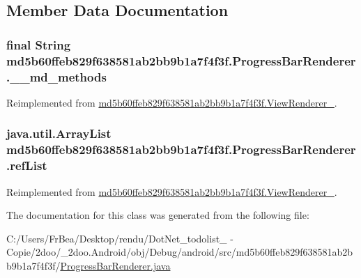 \subsection{Member Data Documentation}
\hypertarget{classmd5b60ffeb829f638581ab2bb9b1a7f4f3f_1_1_progress_bar_renderer_81813d61865c0e1c93ba13fd369721ab}{
\subsubsection[{\_\-\_\-md\_\-methods}]{\setlength{\rightskip}{0pt plus 5cm}final String {\bf md5b60ffeb829f638581ab2bb9b1a7f4f3f.ProgressBarRenderer.\_\-\_\-md\_\-methods}}}
\label{classmd5b60ffeb829f638581ab2bb9b1a7f4f3f_1_1_progress_bar_renderer_81813d61865c0e1c93ba13fd369721ab}




Reimplemented from \hyperlink{classmd5b60ffeb829f638581ab2bb9b1a7f4f3f_1_1_view_renderer__2_80b609e3e4054c380887d4dc2907a875}{md5b60ffeb829f638581ab2bb9b1a7f4f3f.ViewRenderer\_}.\hypertarget{classmd5b60ffeb829f638581ab2bb9b1a7f4f3f_1_1_progress_bar_renderer_e911c6372b6bbc32229ca41ddcf09e5f}{
\subsubsection[{refList}]{\setlength{\rightskip}{0pt plus 5cm}java.util.ArrayList {\bf md5b60ffeb829f638581ab2bb9b1a7f4f3f.ProgressBarRenderer.refList}}}
\label{classmd5b60ffeb829f638581ab2bb9b1a7f4f3f_1_1_progress_bar_renderer_e911c6372b6bbc32229ca41ddcf09e5f}




Reimplemented from \hyperlink{classmd5b60ffeb829f638581ab2bb9b1a7f4f3f_1_1_view_renderer__2_6c151401977148a92c515e9c7de1aaf8}{md5b60ffeb829f638581ab2bb9b1a7f4f3f.ViewRenderer\_}.

The documentation for this class was generated from the following file:\begin{CompactItemize}
\item 
C:/Users/FrBea/Desktop/rendu/DotNet\_\-todolist\_ - Copie/2doo/\_\-2doo.Android/obj/Debug/android/src/md5b60ffeb829f638581ab2bb9b1a7f4f3f/\hyperlink{_progress_bar_renderer_8java}{ProgressBarRenderer.java}\end{CompactItemize}
